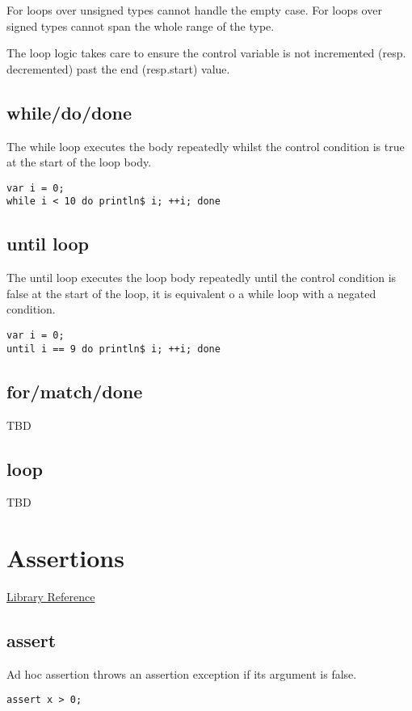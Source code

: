 \documentclass[oneside]{book}
\begin{document}
For loops over unsigned types cannot handle the empty case.
For loops over signed types cannot span the whole range of the type.

The loop logic takes care to ensure the control variable is not
incremented (resp. decremented) past the end (resp.start) value.

\subsection{while/do/done}
The while loop executes the body repeatedly whilst the control
condition is true at the start of the loop body.

\begin{verbatim}
var i = 0;
while i < 10 do println$ i; ++i; done
\end{verbatim}


\subsection{until loop}
The until loop executes the loop body repeatedly
until the control condition is false at the start of the loop,
it is equivalent o a while loop with a negated condition.

\begin{verbatim}
var i = 0;
until i == 9 do println$ i; ++i; done
\end{verbatim}


\subsection{for/match/done}
TBD
\subsection{loop}
TBD
\section{Assertions}
\href{http://felix-lang.org/share/lib/grammar/assertions.fsyn}{Library Reference}
\subsection{assert}
Ad hoc assertion throws an assertion exception if its argument
is false. 

\begin{verbatim}
assert x > 0;
\end{verbatim}
\end{document}
